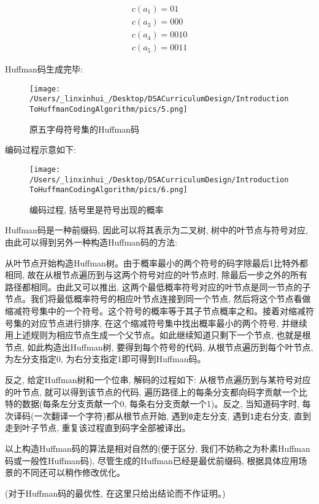 \documentclass{article}
\begin{document}
\begin{CJK}{UTF8}{gbsn}
\begin{gather*}
c(a_1) = 01 \\
c(a_3) = 000 \\
c(a_4) = 0010 \\
c(a_5) = 0011
\end{gather*}

Huffman码生成完毕:

\begin{figure}[H]
\centering
\texttt{[image: /Users/\_linxinhui\_/Desktop/DSACurriculumDesign/IntroductionToHuffmanCodingAlgorithm/pics/5.png]}
\caption{原五字母符号集的Huffman码}
\end{figure}

编码过程示意如下:

\begin{figure}[H]
\centering
\texttt{[image: /Users/\_linxinhui\_/Desktop/DSACurriculumDesign/IntroductionToHuffmanCodingAlgorithm/pics/6.png]}
\caption{编码过程, 括号里是符号出现的概率}
\end{figure}

Huffman码是一种前缀码, 因此可以将其表示为二叉树, 树中的叶节点与符号对应,
由此可以得到另外一种构造Huffman码的方法:

从叶节点开始构造Huffman树。由于概率最小的两个符号的码字除最后1比特外都相同,
故在从根节点遍历到与这两个符号对应的叶节点时,
除最后一步之外的所有路径都相同。由此又可以推出,
这两个最低概率符号对应的叶节点是同一节点的子节点。我们将最低概率符号的相应叶节点连接到同一个节点,
然后将这个节点看做缩减符号集中的一个符号。这个符号的概率等于其子节点概率之和。接着对缩减符号集的对应节点进行排序,
在这个缩减符号集中找出概率最小的两个符号,
并继续用上述规则为相应节点生成一个父节点。如此继续知道只剩下一个节点,
也就是根节点, 如此构造出Huffman树, 要得到每个符号的代码,
从根节点遍历到每个叶节点, 为左分支指定0,
为右分支指定1即可得到Huffman码。

反之, 给定Huffman树和一个位串, 解码的过程如下:
从根节点遍历到与某符号对应的叶节点, 就可以得到该节点的代码,
遍历路径上的每条分支都向码字贡献一个比特的数据(每条左分支贡献一个0,
每条右分支贡献一个1)。反之, 当知道码字时,
每次译码(一次翻译一个字符)都从根节点开始, 遇到\texttt{0}走左分支,
遇到\texttt{1}走右分支, 直到走到叶子节点, 重复该过程直到码字全部被译出。

以上构造Huffman码的算法是相对自然的(便于区分,
我们不妨称之为朴素Huffman码或一般性Huffman码),
尽管生成的Huffman已经是最优前缀码,
根据具体应用场景的不同还可以稍作修改优化。

(对于Huffman码的最优性, 在这里只给出结论而不作证明。)


\end{CJK}
\end{document}
